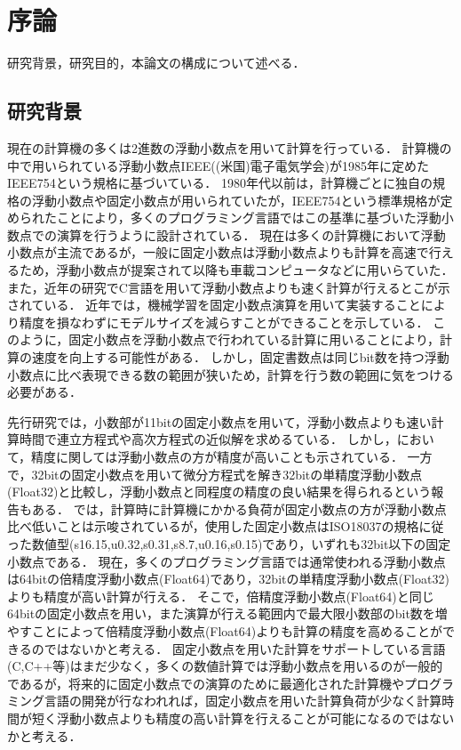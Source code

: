 \chapter{序論}
\label{chap:序論}
研究背景，研究目的，本論文の構成について述べる．

\section{研究背景}

現在の計算機の多くは2進数の浮動小数点を用いて計算を行っている．
計算機の中で用いられている浮動小数点IEEE((米国)電子電気学会)が1985年に定めたIEEE754という規格に基づいている．
1980年代以前は，計算機ごとに独自の規格の浮動小数点や固定小数点が用いられていたが，IEEE754という標準規格が定められたことにより，多くのプログラミング言語ではこの基準に基づいた浮動小数点での演算を行うように設計されている．
現在は多くの計算機において浮動小数点が主流であるが，一般に固定小数点は浮動小数点よりも計算を高速で行えるため，浮動小数点が提案されて以降も車載コンピュータなどに用いらていた．
また，近年の研究でC言語を用いて浮動小数点よりも速く計算が行えるとこが示されている\cite{IJERTV12IS010134}．
近年では，機械学習を固定小数点演算を用いて実装することにより精度を損なわずにモデルサイズを減らすことができることを示している\cite{pmlr-v48-linb16}．
このように，固定小数点を浮動小数点で行われている計算に用いることにより，計算の速度を向上する可能性がある．
しかし，固定書数点は同じbit数を持つ浮動小数点に比べ表現できる数の範囲が狭いため，計算を行う数の範囲に気をつける必要がある．


先行研究では，小数部が11bitの固定小数点を用いて，浮動小数点よりも速い計算時間で連立方程式や高次方程式の近似解を求めるている\cite{IJERTV12IS010134}．
しかし，\cite{IJERTV12IS010134}において，精度に関しては浮動小数点の方が精度が高いことも示されている．
一方で，32bitの固定小数点を用いて微分方程式を解き32bitの単精度浮動小数点(Float32)と比較し，浮動小数点と同程度の精度の良い結果を得られるという報告もある\cite{hopkins2020stochastic}．
\cite{hopkins2020stochastic}では，計算時に計算機にかかる負荷が固定小数点の方が浮動小数点比べ低いことは示唆されているが，使用した固定小数点はISO18037の規格に従った数値型(s16.15,u0.32,s0.31,s8.7,u0.16,s0.15)であり，いずれも32bit以下の固定小数点である．
現在，多くのプログラミング言語では通常使われる浮動小数点は64bitの倍精度浮動小数点(Float64)であり，32bitの単精度浮動小数点(Float32)よりも精度が高い計算が行える．
そこで，倍精度浮動小数点(Float64)と同じ64bitの固定小数点を用い，また演算が行える範囲内で最大限小数部のbit数を増やすことによって倍精度浮動小数点(Float64)よりも計算の精度を高めることができるのではないかと考える．
固定小数点を用いた計算をサポートしている言語(C,C++等)はまだ少なく，多くの数値計算では浮動小数点を用いるのが一般的であるが，将来的に固定小数点での演算のために最適化された計算機やプログラミング言語の開発が行なわれれば，固定小数点を用いた計算負荷が少なく計算時間が短く浮動小数点よりも精度の高い計算を行えることが可能になるのではないかと考える．


